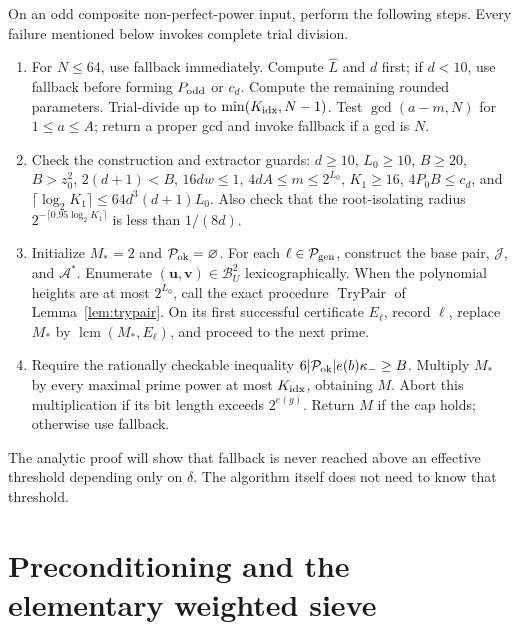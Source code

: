 \begin{algorithm}\label{alg:annihilator}
On an odd composite non-perfect-power input, perform the following
steps.  Every failure mentioned below invokes complete trial division.
\begin{enumerate}
\item For \(N\le64\), use fallback immediately.  Compute
\(\widehat L\) and \(d\) first; if \(d<10\), use fallback before
forming \(P_{\rm odd}\) or \(c_d\).  Compute the remaining rounded
parameters.  Trial-divide up to
\(\min(K_{\rm idx},N-1)\).  Test \(\gcd(a-m,N)\) for
\(1\le a\le A\); return a proper gcd and invoke fallback if a gcd is
\(N\).
\item Check the construction and extractor guards: \(d\ge10\), \(L_0\ge10\),
\(B\ge20\), \(B>z_0^2\), \(2(d+1)<B\), \(16dw\le1\),
\(4dA\le m\le2^{L_0}\), \(K_1\ge16\), \(4P_0B\le c_d\), and
\(\lceil\log_2K_1\rceil\le64d^3(d+1)L_0\).  Also check that the
root-isolating radius \(2^{-\lceil0.95\log_2K_1\rceil}\) is less
than \(1/(8d)\).
\item Initialize \(M_*=2\) and \(\mathcal P_{\rm ok}=\varnothing\).
For each \(\ell\in\mathcal P_{\rm gen}\), construct the base pair,
\(\mathcal J\), and \(\mathcal A^*\).  Enumerate
\((\mathbf u,\mathbf v)\in\mathcal B_U^2\) lexicographically.
When the polynomial heights are at most \(2^{L_0}\), call the exact
procedure \(\operatorname{TryPair}\) of
Lemma~\ref{lem:trypair}.  On its first successful certificate
\(E_\ell\), record \(\ell\), replace
\(M_*\) by \(\operatorname{lcm}(M_*,E_\ell)\), and proceed to the
next prime.
\item Require the rationally checkable inequality
\(6|\mathcal P_{\rm ok}|e(b)\kappa_-\ge B\).  Multiply \(M_*\)
by every maximal prime power at most \(K_{\rm idx}\), obtaining
\(M\).  Abort this multiplication if its bit length exceeds
\(2^{e(g)}\).  Return \(M\) if the cap holds; otherwise use fallback.
\end{enumerate}
\end{algorithm}

The analytic proof will show that fallback is never reached above an
effective threshold depending only on \(\delta\).  The algorithm itself
does not need to know that threshold.

\section{Preconditioning and the elementary weighted sieve}
\label{sec:sieve}

